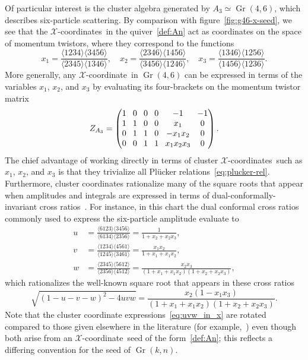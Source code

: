 \documentclass[12pt]{article}
\DeclareMathOperator{\Gr}{Gr}
\def\ket#1{\langle #1 \rangle}
\def\xcoord{$\mathcal{X}$-coordinate}
\def\xcoords{$\mathcal{X}$-coordinates}
\begin{document}
Of particular interest is the cluster algebra generated by $A_3 \simeq \Gr(4,6)$, which describes six-particle scattering. By comparison with figure~\ref{fig:g46-x-seed}, we see that the \xcoords\ in the quiver~\eqref{def:An} act as coordinates on the space of momentum twistors, where they correspond to the functions
\begin{equation}\label{eq:a3-seed-def}
x_1 = \frac{\ket{1234}\ket{3456}}{\ket{2345}\ket{1346}}, \quad x_2 = \frac{\ket{2346}\ket{1456}}{\ket{3456}\ket{1246}}, \quad x_3 = \frac{\ket{1346}\ket{1256}}{\ket{1456}\ket{1236}}.
\end{equation}
More generally, any \xcoord\ in $\Gr(4,6)$ can be expressed in terms of the variables $x_1$, $x_2$, and $x_3$ by evaluating its four-brackets on the momentum twistor matrix
\begin{equation} \label{eq:a3_momentum_twistor_matrix}
Z_{A_3} = 
\begingroup
\setlength\arraycolsep{4pt}
\begin{pmatrix} 
1 & 0 & 0 & 0 & -1 & -1 \\
1 & 1 & 0 & 0 & x_1 & 0 \\
0 & 1 & 1 & 0 & -x_1 x_2 & 0 \\
0 & 0 & 1 & 1 & x_1 x_2 x_3 & 0
\end{pmatrix}
\endgroup .
\end{equation}
The chief advantage of working directly in terms of cluster \xcoords\ such as $x_1$, $x_2$, and $x_3$ is that they trivialize all Pl\"ucker relations~\eqref{eq:plucker-rel}. Furthermore, cluster coordinates rationalize many of the square roots that appear when amplitudes and integrals are expressed in terms of dual-conformally-invariant cross ratios~\cite{Bourjaily:2018aeq}. For instance, in this chart the dual conformal cross ratios commonly used to express the six-particle amplitude evaluate to
\begin{align} \label{eq:uvw_in_x}
u &= \frac{\ket{6123}\ket{3456}}{\ket{6134}\ket{2356}} = \frac{1}{1+x_2+x_2 x_3}, \\ 
v &= \frac{\ket{1234} \ket{4561}}{\ket{1245}\ket{3461}} =\frac{x_1 x_2}{1+x_1+x_1 x_2}, \\ 
w &= \frac{\ket{2345} \ket{5612}}{\ket{2356}\ket{4512}} =\frac{x_2 x_3}{(1+x_1+x_1 x_2)(1+x_2+x_2 x_3)},
\end{align}
which rationalizes the well-known square root that appears in these cross ratios 
\begin{equation}
\sqrt{(1 - u - v - w)^2 - 4 u v w} = \frac{x_2 \left(1-x_1 x_3\right)}{\left(1+x_1+x_1
   x_2\right) \left(1+x_2+x_2 x_3\right)} .
\end{equation}
Note that the cluster coordinate expressions~\eqref{eq:uvw_in_x} are rotated compared to those given elsewhere in the literature (for example,~\cite{Golden:2013xva,Parker:2015cia}) even though both arise from an \xcoord\ seed of the form~\eqref{def:An}; this reflects a differing convention for the seed of $\Gr(k,n)$.
\end{document}
